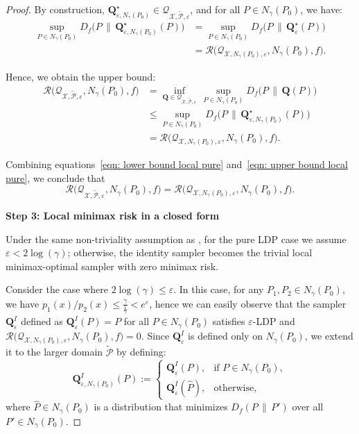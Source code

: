 \documentclass[accepted]{article}
\theoremstyle{plain} %
\theoremstyle{definition}
\theoremstyle{remark}
\newcommand{\eps}{\varepsilon}
\newcommand{\bQ}{\mathbf{Q}}
\begin{document}
\begin{proof}
By construction, \(\bQ^\star_{\eps, N_\gamma(P_0)} \in \mathcal{Q}_{\mathcal{X}, \tilde{\mathcal{P}}, \eps}\), 
and for all \(P \in N_\gamma(P_0)\), we have:
\begin{align*}
\sup_{P \in N_\gamma(P_0)} D_f\big(P \, \| \, \bQ^\star_{\eps, N_\gamma(P_0)}(P)\big) 
&= \sup_{P \in N_\gamma(P_0)} D_f\big(P \, \| \, \bQ^\star_\eps(P)\big) \\
&= \mathcal{R}\big(\mathcal{Q}_{\mathcal{X}, N_\gamma(P_0), \eps}, N_\gamma(P_0), f\big).
\end{align*}

Hence, we obtain the upper bound:
\begin{align} \label{eqn: upper bound local pure}
\mathcal{R}\big(\mathcal{Q}_{\mathcal{X}, \tilde{\mathcal{P}}, \eps}, N_\gamma(P_0), f\big)
&= \inf_{\bQ \in \mathcal{Q}_{\mathcal{X}, \tilde{\mathcal{P}}, \eps}} \,
\sup_{P \in N_\gamma(P_0)} D_f\big(P \, \| \, \bQ(P)\big) \nonumber \\ 
&\leq \sup_{P \in N_\gamma(P_0)} D_f\big(P \, \| \, \bQ^\star_{\eps, N_\gamma(P_0)}(P)\big)  \nonumber \\ & = \mathcal{R}\big(\mathcal{Q}_{\mathcal{X}, N_\gamma(P_0), \eps}, N_\gamma(P_0), f\big).
\end{align}

Combining equations~\eqref{eqn: lower bound local pure} and~\eqref{eqn: upper bound local pure}, 
we conclude that
\[
\mathcal{R}\Big(\mathcal{Q}_{\mathcal{X}, \tilde{\mathcal{P}}, \eps}, N_\gamma(P_0), f\Big) 
= \mathcal{R}\Big(\mathcal{Q}_{\mathcal{X}, N_\gamma(P_0), \eps}, N_\gamma(P_0), f\Big).
\] 

\textbf{Step 3: Local minimax risk in a closed form} 


Under the same non-triviality assumption as \citet{park2024exactly}, for the pure LDP case we assume \(\varepsilon < 2\log(\gamma)\); otherwise, the identity sampler becomes the trivial local minimax-optimal sampler with zero minimax risk.


Consider the case where $2 \log(\gamma) \le \eps$. In this case, for any $P_1, P_2 \in N_{\gamma}(P_0)$, we have 
$p_1(x)/p_2(x) \leq \frac{\gamma}{\frac{1}{\gamma}} < e^{\varepsilon}$, hence we can easily observe that the sampler 
$\mathbf{Q}^I_\eps$ defined as $\mathbf{Q}^I_\eps(P) = P$ for all $P \in N_{\gamma}(P_0)$ satisfies 
$\eps$-LDP and  $\mathcal{R}\big(\mathcal{Q}_{\mathcal{X},N_\gamma(P_0),\eps},N_\gamma(P_0),f\big) = 0$. Since \(\bQ^I_\eps\) is defined only on \(N_\gamma(P_0)\), we extend it to the larger domain 
\(\tilde{\mathcal{P}}\) by defining:
\[
\bQ^I_{\eps, N_\gamma(P_0)}(P) := 
\begin{cases}
\bQ^I_\eps(P), & \text{if } P \in N_\gamma(P_0), \\[6pt]
\bQ^I_\eps(\hat{P}), & \text{otherwise},
\end{cases}
\]
where \( \hat{P} \in N_\gamma(P_0) \) is a distribution that minimizes \(  D_f(P \,\|\, P') \) over all $P' \in N_\gamma(P_0)$.


\end{proof}
\end{document}
